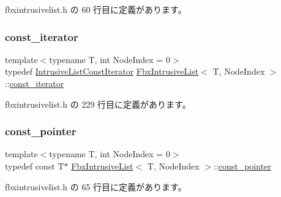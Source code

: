  fbxintrusivelist.\+h の 60 行目に定義があります。

\mbox{\label{class_fbx_intrusive_list_a4c0c567c56a712e7ffca9c6bb5990169}} 
\subsubsection{\texorpdfstring{const\+\_\+iterator}{const\_iterator}}
{\footnotesize\ttfamily template$<$typename T, int Node\+Index = 0$>$ \\
typedef \hyperlink{class_fbx_intrusive_list_1_1_intrusive_list_const_iterator}{Intrusive\+List\+Const\+Iterator} \hyperlink{class_fbx_intrusive_list}{Fbx\+Intrusive\+List}$<$ T, Node\+Index $>$\+::\hyperlink{class_fbx_intrusive_list_a4c0c567c56a712e7ffca9c6bb5990169}{const\+\_\+iterator}}



 fbxintrusivelist.\+h の 229 行目に定義があります。

\mbox{\label{class_fbx_intrusive_list_ae8232fd6a6ef678e5d5eed6ad978994c}} 
\subsubsection{\texorpdfstring{const\+\_\+pointer}{const\_pointer}}
{\footnotesize\ttfamily template$<$typename T, int Node\+Index = 0$>$ \\
typedef const T$\ast$ \hyperlink{class_fbx_intrusive_list}{Fbx\+Intrusive\+List}$<$ T, Node\+Index $>$\+::\hyperlink{class_fbx_intrusive_list_ae8232fd6a6ef678e5d5eed6ad978994c}{const\+\_\+pointer}}



 fbxintrusivelist.\+h の 65 行目に定義があります。

\mbox{\label{class_fbx_intrusive_list_a21904cb72c0ccae9d5c0b9f171befeb8}} 
